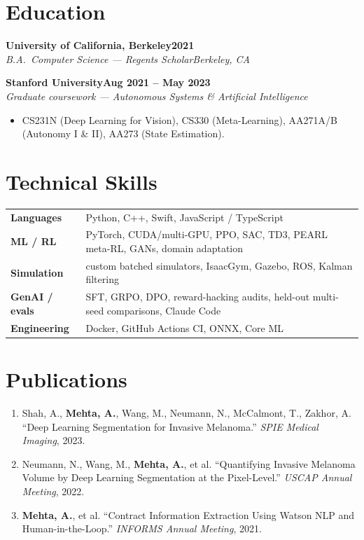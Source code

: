 \documentclass[10pt]{article}
\newcommand{\role}[4]{\par\vspace{3pt}\textbf{#1}\hfill\textbf{#2}\\\textit{#3}\hfill\textit{#4}}
\begin{document}
\section*{Education}

\role{University of California, Berkeley}{2021}{B.A.\ Computer Science --- Regents Scholar}{Berkeley, CA}

\role{Stanford University}{Aug 2021 -- May 2023}{Graduate coursework --- Autonomous Systems \& Artificial Intelligence}{}
\begin{itemize}
\item CS231N (Deep Learning for Vision), CS330 (Meta-Learning), AA271A/B (Autonomy I \& II), AA273 (State Estimation).
\end{itemize}

\section*{Technical Skills}
\begin{tabular}{@{}p{0.9in}l}
\textbf{Languages} & Python, C++, Swift, JavaScript / TypeScript \\
\textbf{ML / RL} & PyTorch, CUDA/multi-GPU, PPO, SAC, TD3, PEARL meta-RL, GANs, domain adaptation \\
\textbf{Simulation} & custom batched simulators, IsaacGym, Gazebo, ROS, Kalman filtering \\
\textbf{GenAI / evals} & SFT, GRPO, DPO, reward-hacking audits, held-out multi-seed comparisons, Claude Code \\
\textbf{Engineering} & Docker, GitHub Actions CI, ONNX, Core ML \\
\end{tabular}

\section*{Publications}
\begin{enumerate}[leftmargin=1.4em,itemsep=1pt,topsep=1pt]
\item Shah, A., \textbf{Mehta, A.}, Wang, M., Neumann, N., McCalmont, T., Zakhor, A. ``Deep Learning Segmentation for Invasive Melanoma.'' \textit{SPIE Medical Imaging}, 2023.
\item Neumann, N., Wang, M., \textbf{Mehta, A.}, et al. ``Quantifying Invasive Melanoma Volume by Deep Learning Segmentation at the Pixel-Level.'' \textit{USCAP Annual Meeting}, 2022.
\item \textbf{Mehta, A.}, et al. ``Contract Information Extraction Using Watson NLP and Human-in-the-Loop.'' \textit{INFORMS Annual Meeting}, 2021.
\end{enumerate}
\end{document}
